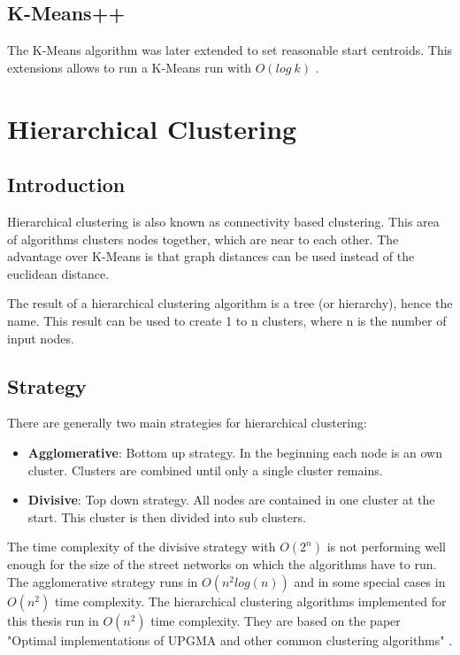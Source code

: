 \subsection{K-Means++}
The K-Means algorithm was later extended to set reasonable start centroids. This extensions allows to run a K-Means run with $O(log\ k)$ \cite{k-means++:2007}.

\pagebreak
\FloatBarrier
\section{Hierarchical Clustering} 
\label{sec:hierarchicalClustering}
\subsection{Introduction}
Hierarchical clustering is also known as connectivity based clustering. This area of algorithms clusters nodes together, which are near to each other. The advantage over K-Means is that graph distances can be used instead of the euclidean distance.

The result of a hierarchical clustering algorithm is a tree (or hierarchy), hence the name. This result can be used to create 1 to n clusters, where n is the number of input nodes.

\subsection{Strategy}
There are generally two main strategies for hierarchical clustering:

\begin{itemize}
    \item \textbf{Agglomerative}: Bottom up strategy. In the beginning each node is an own cluster. Clusters are combined until only a single cluster remains.
    \item \textbf{Divisive}: Top down strategy. All nodes are contained in one cluster at the start. This cluster is then divided into sub clusters.
\end{itemize}

The time complexity of the divisive strategy with $O(2^n)$ is not performing well enough for the size of the street networks on which the algorithms have to run. The agglomerative strategy runs in $O(n^2 log(n))$ and in some special cases in $O(n^2)$ time complexity. The hierarchical clustering algorithms implemented for this thesis run in $O(n^2)$ time complexity. They are based on the paper "Optimal implementations of UPGMA and other common clustering algorithms" \cite{clustering:2007}.

